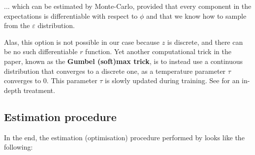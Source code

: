 \documentclass{article}
\begin{document}
\begin{appendix}
\begin{multicols}{2}
... which can be estimated by Monte-Carlo, provided that every component in the expectations is differentiable with respect to $\phi$ and that we know how to sample from the $\varepsilon$ distribution.

Alas, this option is not possible in our case because $z$ is discrete, and there can be no such differentiable $r$ function. Yet another computational trick in the paper, known as the \textbf{Gumbel (soft)max trick}, is to instead use a continuous distribution that converges to a discrete one, as a temperature parameter $\tau$ converges to $0$. This parameter $\tau$ is slowly updated during training. See \citet{gumbelmaxtrick} for an in-depth treatment.

\clearpage

\subsection{Estimation procedure} \label{app:estimation}

In the end, the estimation (optimisation) procedure performed by \citet{zeroshot} looks like the following:

\newcommand{\zn}{\mathbf{z}_n}


\end{multicols}
\end{appendix}
\end{document}
